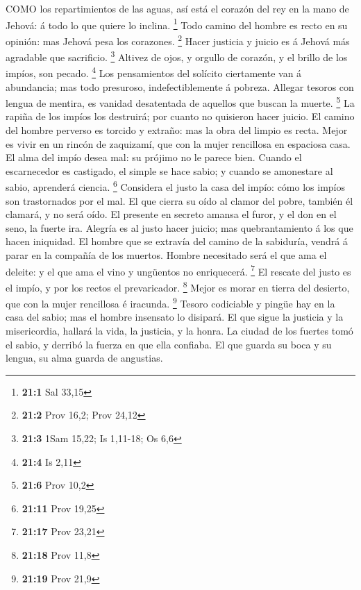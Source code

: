  COMO los repartimientos de las aguas, así está el corazón
del rey en la mano de Jehová: á todo lo que quiere lo inclina.
\footnote{\textbf{21:1} Sal 33,15}  Todo camino del hombre
es recto en su opinión: mas Jehová pesa los corazones. \footnote{\textbf{21:2}
  Prov 16,2; Prov 24,12}  Hacer justicia y juicio es á
Jehová más agradable que sacrificio. \footnote{\textbf{21:3} 1Sam 15,22;
  Is 1,11-18; Os 6,6}  Altivez de ojos, y orgullo de
corazón, y el brillo de los impíos, son pecado. \footnote{\textbf{21:4}
  Is 2,11}  Los pensamientos del solícito ciertamente van á
abundancia; mas todo presuroso, indefectiblemente á pobreza.
 Allegar tesoros con lengua de mentira, es vanidad
desatentada de aquellos que buscan la muerte. \footnote{\textbf{21:6}
  Prov 10,2}  La rapiña de los impíos los destruirá; por
cuanto no quisieron hacer juicio.  El camino del hombre
perverso es torcido y extraño: mas la obra del limpio es recta.
 Mejor es vivir en un rincón de zaquizamí, que con la mujer
rencillosa en espaciosa casa.  El alma del impío desea mal:
su prójimo no le parece bien.  Cuando el escarnecedor es
castigado, el simple se hace sabio; y cuando se amonestare al sabio,
aprenderá ciencia. \footnote{\textbf{21:11} Prov 19,25} 
Considera el justo la casa del impío: cómo los impíos son trastornados
por el mal.  El que cierra su oído al clamor del pobre,
también él clamará, y no será oído.  El presente en secreto
amansa el furor, y el don en el seno, la fuerte ira. 
Alegría es al justo hacer juicio; mas quebrantamiento á los que hacen
iniquidad.  El hombre que se extravía del camino de la
sabiduría, vendrá á parar en la compañía de los muertos. 
Hombre necesitado será el que ama el deleite: y el que ama el vino y
ungüentos no enriquecerá. \footnote{\textbf{21:17} Prov 23,21}
 El rescate del justo es el impío, y por los rectos el
prevaricador. \footnote{\textbf{21:18} Prov 11,8}  Mejor es
morar en tierra del desierto, que con la mujer rencillosa é iracunda.
\footnote{\textbf{21:19} Prov 21,9}  Tesoro codiciable y
pingüe hay en la casa del sabio; mas el hombre insensato lo disipará.
 El que sigue la justicia y la misericordia, hallará la
vida, la justicia, y la honra.  La ciudad de los fuertes
tomó el sabio, y derribó la fuerza en que ella confiaba. 
El que guarda su boca y su lengua, su alma guarda de angustias.
